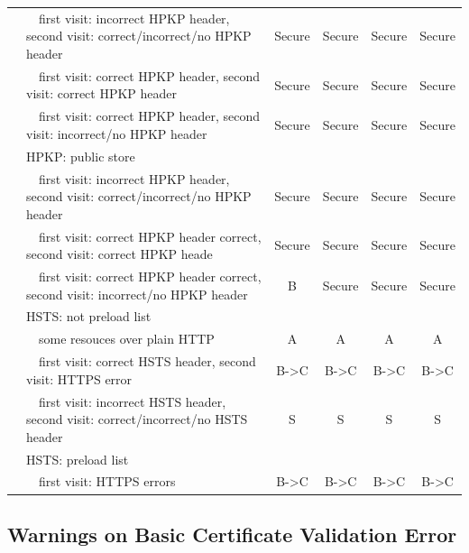 \begin{table}[htbp]
\begin{tabular}{p{2.2cm}|l|cccc}
 & ~~first visit: incorrect HPKP header, second visit: correct/incorrect/no HPKP header & Secure & Secure & Secure & Secure \\
 & ~~first visit: correct HPKP header, second visit: correct HPKP header & Secure & Secure & Secure & Secure \\
 & ~~first visit: correct HPKP header, second visit: incorrect/no HPKP header & Secure & Secure & Secure & Secure \\
 & HPKP: public store &  &  &  &  \\
 & ~~first visit: incorrect HPKP header, second visit: correct/incorrect/no HPKP header & Secure & Secure & Secure & Secure \\
 & ~~first visit: correct HPKP header correct, second visit: correct HPKP heade & Secure & Secure & Secure & Secure \\
 & ~~first visit: correct HPKP header correct, second visit: incorrect/no HPKP header & B & Secure & Secure & Secure \\ \cline{2-6}
 & HSTS: not preload list &  &  &  &  \\
 & ~~some resouces over plain HTTP & A & A & A & A \\
 & ~~first visit: correct HSTS header, second visit: HTTPS error & B-\textgreater{}C & B-\textgreater{}C & B-\textgreater{}C & B-\textgreater{}C \\
 & ~~first visit: incorrect HSTS header, second visit: correct/incorrect/no HSTS header & S & S & S & S \\
 & HSTS: preload list &  &  &  &  \\
 & ~~first visit: HTTPS errors & B-\textgreater{}C & B-\textgreater{}C & B-\textgreater{}C & B-\textgreater{}C \\ \bottomrule
\end{tabular}
\end{table}%



\subsection{Warnings on Basic Certificate Validation Error}

